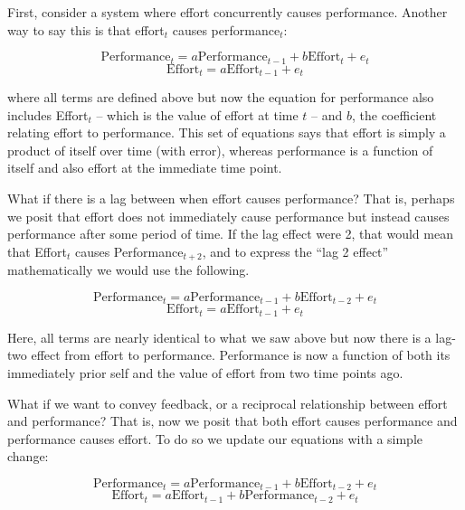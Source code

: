 \documentclass[english,,man]{apa6}
\theoremstyle{definition}
\theoremstyle{definition}
\theoremstyle{definition}
\theoremstyle{remark}
\begin{document}
First, consider a system where effort concurrently causes performance.
Another way to say this is that effort\(_t\) causes performance\(_t\):

\begin{equation}
\label{sysy2}
\textrm{Performance}_{t} = a \textrm{Performance}_{t - 1} + b \textrm{Effort}_{t} + e_{t}
\end{equation} \begin{equation}
\label{sysx2}
\textrm{Effort}_{t} = a \textrm{Effort}_{t - 1} + e_{t}
\end{equation}

\noindent where all terms are defined above but now the equation for
performance also includes Effort\(_t\) -- which is the value of effort
at time \(t\) -- and \(b\), the coefficient relating effort to
performance. This set of equations says that effort is simply a product
of itself over time (with error), whereas performance is a function of
itself and also effort at the immediate time point.

What if there is a lag between when effort causes performance? That is,
perhaps we posit that effort does not immediately cause performance but
instead causes performance after some period of time. If the lag effect
were 2, that would mean that Effort\(_t\) causes Performance\(_{t+2}\),
and to express the \enquote{lag 2 effect} mathematically we would use
the following.

\begin{equation}
\label{sysy3}
\textrm{Performance}_{t} = a \textrm{Performance}_{t - 1} + b \textrm{Effort}_{t - 2} + e_{t}
\end{equation} \begin{equation}
\label{sysx3}
\textrm{Effort}_{t} = a \textrm{Effort}_{t - 1} + e_{t}
\end{equation}

\noindent Here, all terms are nearly identical to what we saw above but
now there is a lag-two effect from effort to performance. Performance is
now a function of both its immediately prior self and the value of
effort from two time points ago.

What if we want to convey feedback, or a reciprocal relationship between
effort and performance? That is, now we posit that both effort causes
performance and performance causes effort. To do so we update our
equations with a simple change:

\begin{equation}
\label{sysy3}
\textrm{Performance}_{t} = a \textrm{Performance}_{t - 1} + b \textrm{Effort}_{t - 2} + e_{t}
\end{equation} \begin{equation}
\label{sysx3}
\textrm{Effort}_{t} = a \textrm{Effort}_{t - 1} + b \textrm{Performance}_{t - 2} + e_{t}
\end{equation}
\end{document}
